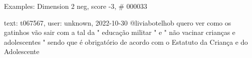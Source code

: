 \begin{frame}{Examples: Dimension 2 neg, score -3, \# 000033}
\footnotesize
\begin{alertblock}{text: t067567, user: unknown, 2022-10-30}
@liviabotelhob quero ver como os gatinhos vão sair com a tal da " educação 
militar " e " não vacinar crianças e adolescentes " sendo que é obrigatório de 
acordo com o Estatuto da Criança e do Adolescente 
 \textbf{} 
\textbf{} 
\end{alertblock}
\end{frame}
